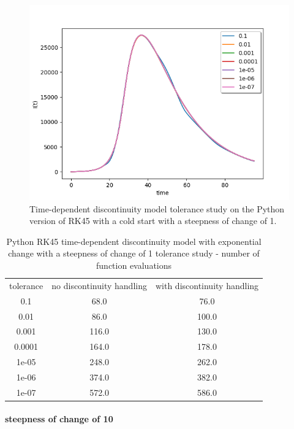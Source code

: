 \begin{figure}[H]
\centering
\includegraphics[width=0.7\linewidth]{./figures/exp_time_tol_rk45_event_1}
\caption{Time-dependent discontinuity model tolerance study on the Python version of RK45 with a cold start with a steepness of change of 1.}
\label{fig:exp_time_tol_rk45_event_1}
\end{figure}

\begin{table}[H]
\caption {Python RK45 time-dependent discontinuity model with exponential change with a steepness of change of 1 tolerance study - number of function evaluations} \label{tab:exp_time_tol_rk45_1} 
\begin{center}
\begin{tabular}{ c c c }
tolerance & no discontinuity handling & with discontinuity handling \\ 
0.1 & 68.0 & 76.0 \\
0.01 & 86.0 & 100.0 \\
0.001 & 116.0 & 130.0 \\
0.0001 & 164.0 & 178.0 \\
1e-05 & 248.0 & 262.0 \\
1e-06 & 374.0 & 382.0 \\
1e-07 & 572.0 & 586.0 \\
\end{tabular}
\end{center}
\end{table}


\paragraph{steepness of change of 10}

